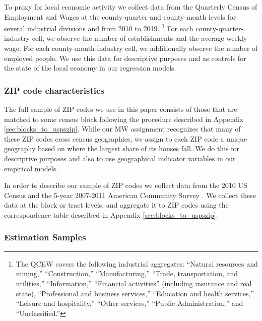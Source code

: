 To proxy for local economic activity we collect data from the 
Quarterly Census of Employment and Wages \parencite[QCEW;][]{QCEW} 
at the county-quarter and county-month levels for several industrial divisions 
and from 2010 to 2019.%
\footnote{The QCEW covers the following industrial aggregates: 
``Natural resources and mining,'' ``Construction,'' ``Manufacturing,'' 
``Trade, transportation, and utilities,'' ``Information,'' 
``Financial activities'' (including insurance and real state), 
``Professional and business services,'' ``Education and health services,'' 
``Leisure and hospitality,'' ``Other services,'' ``Public Administration,''
and ``Unclassified.''}
For each county-quarter-industry cell, we observe the number of establishments 
and the average weekly wage.
For each county-month-industry cell, we additionally observe the number of 
employed people.
We use this data for descriptive purposes and as controls for the state of 
the local economy in our regression models.


\subsubsection{ZIP code characteristics}
\label{sec:data_other_cross}

The full sample of ZIP codes we use in this paper consists of those that are 
matched to some census block following the procedure described in Appendix \ref{sec:blocks_to_uspszip}.
While our MW assignment recognizes that many of these ZIP codes cross census 
geographies, we assign to each ZIP code a unique geography based on where the 
largest share of its houses fall.
We do this for descriptive purposes and also to use geographical indicator 
variables in our empirical models.

In order to describe our sample of ZIP codes we collect data from the 
2010 US Census \parencite{CensusDecennial} and
the 5-year 2007-2011 American Community Survey \parencite[ACS;][]{CensusACS}.
We collect these data at the block or tract levels, and aggregate it to ZIP codes
using the correspondence table described in Appendix \ref{sec:blocks_to_uspszip}.

\subsubsection{Estimation Samples}\label{sec:data_final_panel}

